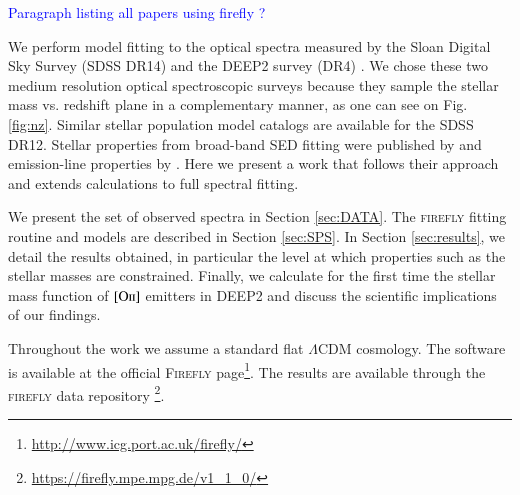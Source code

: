 \documentclass[onecolumn]{aa}
\newcommand{\OII}{$\left[\mathrm{O\textrm{\textsc{ii}}}\right]$\xspace}
\begin{document}
\textcolor{blue}{Paragraph listing all papers using firefly ?}

We perform model fitting to the optical spectra measured by the Sloan Digital Sky Survey (SDSS DR14) and the DEEP2 survey (DR4) \citep{SDSS_DR14,Newman_2013}. 
We chose these two medium resolution optical spectroscopic surveys because they sample the stellar mass vs. redshift plane in a complementary manner, as one can see on Fig. \ref{fig:nz}. 
Similar stellar population model catalogs are available for the SDSS DR12. Stellar properties from broad-band SED fitting were published by \citet{Maraston2013} and emission-line properties by \citet{Thomas2013a}. Here we present a work that follows their approach and extends calculations to full spectral fitting. 

We present the set of observed spectra in Section \ref{sec:DATA}. 
The \textsc{firefly} fitting routine and models are described in Section \ref{sec:SPS}. 
In Section \ref{sec:results}, we detail the results obtained, in particular the level at which properties such as the stellar masses are constrained. 
Finally, 
 we calculate for the first time the stellar mass function of \OII emitters in DEEP2 and discuss the scientific implications of our findings.

Throughout the work we assume a standard flat $\Lambda$CDM \citep{Planck_2014} cosmology. 
The software is available at the official \textsc{Firefly} page\footnote{\url{http://www.icg.port.ac.uk/firefly/}}.
The results are available through the \textsc{firefly} data repository
\footnote{\url{https://firefly.mpe.mpg.de/v1_1_0/}}.
\end{document}
